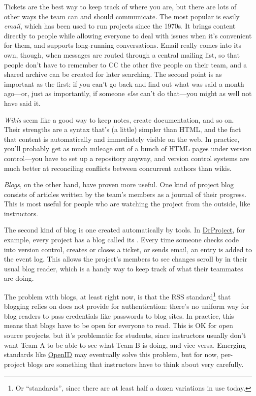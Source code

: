 \documentclass{report}
\begin{document}
Tickets are the best way to keep track of where you are, but there are
lots of other ways the team can and should communicate.  The most
popular is easily \emph{email}, which has been used to run projects
since the 1970s.  It brings content directly to people while allowing
everyone to deal with issues when it's convenient for them, and
supports long-running conversations.  Email really comes into its own,
though, when messages are routed through a central mailing list, so
that people don't have to remember to CC the other five people on
their team, and a shared archive can be created for later searching.
The second point is as important as the first: if you can't go back
and find out what was said a month ago---or, just as importantly, if
someone \emph{else} can't do that---you might as well not have said
it.

\emph{Wikis} seem like a good way to keep notes, create documentation,
and so on.  Their strengths are a syntax that's (a little) simpler
than HTML, and the fact that content is automatically and immediately
visible on the web.  In practice, you'll probably get as much mileage
out of a bunch of HTML pages under version control---you have to set
up a repository anyway, and version control systems are much better at
reconciling conflicts between concurrent authors than wikis.

\emph{Blogs}, on the other hand, have proven more useful.  One kind of
project blog consists of articles written by the team's members as a
journal of their progress.  This is most useful for people who are
watching the project from the outside, like instructors.

The second kind of blog is one created automatically by tools.  In
\url{DrProject}, for example, every project has a blog called its
.  Every time someone checks code into version
control, creates or closes a ticket, or sends email, an entry is added
to the event log.  This allows the project's members to see changes
scroll by in their usual blog reader, which is a handy way to keep
track of what their teammates are doing.

The problem with blogs, at least right now, is that the RSS
standard\footnote{Or ``standards'', since there are at least half a
dozen variations in use today.} that blogging relies on does not
provide for authentication: there's no uniform way for blog readers to
pass credentials like passwords to blog sites.  In practice, this
means that blogs have to be open for everyone to read.  This is OK for
open source projects, but it's problematic for students, since
instructors usually don't want Team A to be able to see what Team B is
doing, and vice versa.  Emerging standards like \url{OpenID} may
eventually solve this problem, but for now, per-project blogs are
something that instructors have to think about very carefully.
\end{document}
